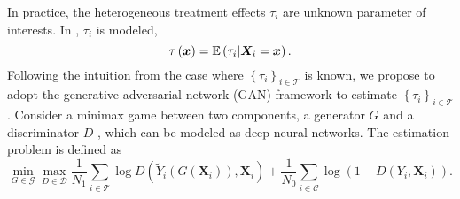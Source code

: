 In practice, the heterogeneous treatment effects \(\tau _{i} \) are unknown parameter of interests. In \citet{wager/athey:2018:rf_hte}, \(\tau _{i} \) is modeled,
\[
    \tau \left( \bm{x} \right)  = \mathbb{E} \left( \tau _{i} \vert \bm{X}_{i} = \bm{x} \right).
\]
Following the intuition from the case where \(\left\{ \tau _{i}  \right\}_{i \in \mathcal{T} }\) is known, we propose to adopt the generative adversarial network (GAN) framework \citep{goodfellow:2014:GAN,kaji/manresa/pouliot:2022:adversarial_est} to estimate \(\left\{ \tau _{i}  \right\} _{i\in \mathcal{T} }\). Consider a minimax game between two components, a generator \(G\)  and a discriminator \(D\) , which can be modeled as deep neural networks. The estimation problem is defined as
\begin{equation}
    \min_{G\in \mathcal{G} } \max_{D \in \mathcal{D} } 
    \frac{1}{N_{1}} \sum_{i \in \mathcal{T} } 
        \log D\left( \tilde{Y} _{i} \left( G\left( \bm{X} _{i}  \right)  \right), \bm{X} _{i}  \right) + 
    \frac{1}{N_{0}} \sum_{i\in \mathcal{C} } \log \left( 
        1 - D\left( Y _{i} , \bm{X} _{i}  \right)
     \right).
\end{equation}








